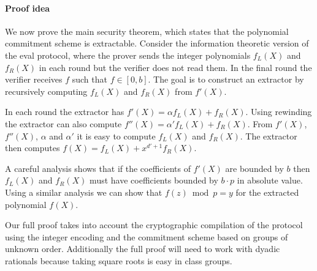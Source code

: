 \documentclass{article}
\theoremstyle{definition}
\begin{document}
\paragraph{Proof idea}
We now prove the main security theorem, which states that the polynomial commitment scheme is extractable. Consider the information theoretic version of the eval protocol, where the prover sends the integer polynomials $f_L(X)$ and $f_R(X)$ in each round but the verifier does not read them.
In the final round the verifier receives $f$ such that $f \in [0,b]$. The goal is to construct an extractor by recursively computing $f_L(X)$ and $f_R(X)$ from $f'(X)$.

In each round the extractor has $f'(X)=\alpha f_L(X)+ f_R(X)$. Using rewinding the extractor can also compute $f''(X)=\alpha' f_L(X)+ f_R(X)$. From $f'(X)$, $f''(X)$, $\alpha$ and $\alpha'$ it is easy to compute $f_L(X)$ and $f_R(X)$. The extractor then computes $f(X)=f_L(X)+x^{d'+1} f_R(X)$.

A careful analysis shows that if the coefficients of $f'(X)$ are bounded by $b$ then $f_L(X)$ and $f_R(X)$ must have coefficients bounded by $b \cdot p$ in absolute value. Using a similar analysis we can show that $f(z)\bmod p=y$ for the extracted polynomial $f(X)$.

Our full proof takes into account the cryptographic compilation of the protocol using the integer encoding and the commitment scheme based on groups of unknown order. Additionally the full proof will need to work with dyadic rationals because taking square roots is easy in class groups.
\end{document}
